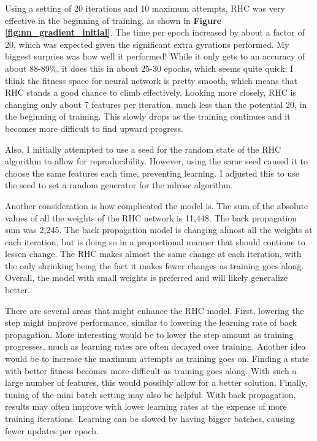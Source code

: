 \documentclass[letterpaper]{article} %
\begin{document}
Using a setting of 20 iterations and 10 maximum attempts, RHC was very effective in the beginning of training, as shown in \textbf{Figure \ref{fig:nn_gradient_initial}}.  The time per epoch increased by about a factor of 20, which was expected given the significant extra gyrations performed.  My biggest surprise was how well it performed!  While it only gets to an accuracy of about 88-89\%, it does this in about 25-30 epochs, which seems quite quick.  I think the fitness space for neural network is pretty smooth, which means that RHC stands a good chance to climb effectively.  Looking more closely, RHC is changing only about 7 features per iteration, much less than the potential 20, in the beginning of training.  This slowly drops as the training continues and it becomes more difficult to find upward progress.  

Also, I initially attempted to use a seed for the random state of the RHC algorithm to allow for reproducibility.  However, using the same seed caused it to choose the same features each time, preventing learning.  I adjusted this to use the seed to set a random generator for the mlrose algorithm.

Another consideration is how complicated the model is.   The sum of the absolute values of all the weights of the RHC network is 11,448.  The back propagation sum was 2,245.  The back propagation model is changing almost all the weights at each iteration, but is doing so in a proportional manner that should continue to lessen change.  The RHC makes almost the same change at each iteration, with the only shrinking being the fact it makes fewer changes as training goes along.  Overall, the model with small weights is preferred and will likely generalize better. 

There are several areas that might enhance the RHC model. First, lowering the step might improve performance, similar to lowering the learning rate of back propagation.  More interesting would be to lower the step amount as training progresses,  much as learning rates are often decayed over training.  Another idea would be to increase the maximum attempts as training goes on.  Finding a state with better fitness becomes more difficult as training goes along. With such a large number of features,  this would possibly allow for a better solution.  Finally, tuning of the mini batch setting may also be helpful.  With back propagation, results may often improve with lower learning rates at the expense of more training iterations.  Learning can be slowed by having bigger batches, causing fewer updates per epoch.  
\end{document}
